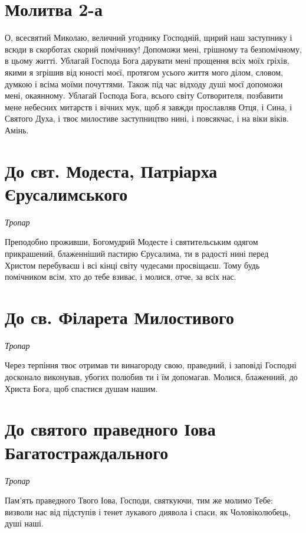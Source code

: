 \documentclass[chapters.tex]{subfiles}
\begin{document}
\section{Молитва 2-а}
О, всесвятий Миколаю, величний угоднику Господній, щирий наш заступнику і всюди в скорботах скорий помічнику! Допоможи мені, грішному та безпомічному, в цьому житті. Ублагай Господа Бога дарувати мені прощення всіх моїх гріхів, якими я згрішив від юності моєї, протягом усього життя мого ділом, словом, думкою і всіма моїми почуттями. Також під час відходу душі моєї допоможи мені, окаянному. Ублагай Господа Бога, всього світу Сотворителя, позбавити мене небесних митарств і вічних мук, щоб я завжди прославляв Отця, і Сина, і Святого Духа, і твоє милостиве заступництво нині, і повсякчас, і на віки віків. Амінь.

\section{До свт. Модеста, Патріарха Єрусалимського}
\emph{Тропар}

Преподобно проживши, Богомудрий Модесте і святительським одягом прикрашений, блаженніший пастирю Єрусалима, ти в радості нині перед Христом перебуваєш і всі кінці світу чудесами просвіщаєш. Тому будь помічником всім, хто до тебе взиває, і молися, отче, за всіх нас.

\section{До св. Філарета Милостивого}
\emph{Тропар}

Через терпіння твоє отримав ти винагороду свою, праведний, і заповіді Господні досконало виконував, убогих полюбив ти і їм допомагав. Молися, блаженний, до Христа Бога, щоб спастися душам нашим.

\section{До святого праведного Іова Багатостраждального}
\emph{Тропар}

Пам’ять праведного Твого Іова, Господи, святкуючи, тим же молимо Тебе: визволи нас від підступів і тенет лукавого диявола і спаси, як Чоловіколюбець, душі наші.
\end{document}
